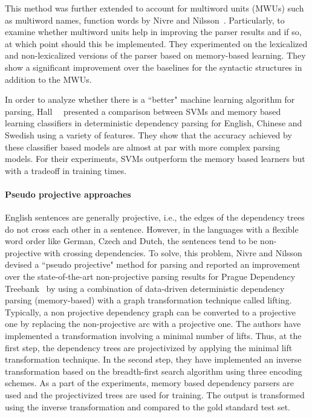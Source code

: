 This method was further extended to account for multiword units (MWUs) such as multiword names, function words by Nivre and Nilsson~\cite{nivre2004multiword}. Particularly, to examine whether multiword units help in improving the parser results and if so, at which point should this be implemented. They experimented on the lexicalized and non-lexicalized versions of the parser based on memory-based learning. They show a significant improvement over the baselines for the syntactic structures in addition to the MWUs.

In order to analyze whether there is a ``better" machine learning algorithm for parsing, Hall~\etal~\cite{Hall:2006:DCD:1273073.1273114} presented a comparison between SVMs and memory based learning classifiers in deterministic dependency parsing for English, Chinese and Swedish using a variety of features. They show that the accuracy achieved by these classifier based models are almost at par with more complex parsing models. For their experiments, SVMs outperform the memory based learners but with a tradeoff in training times.

\paragraph{Pseudo projective approaches}

English sentences are generally projective, i.e., the edges of the dependency trees do not cross each other in a sentence. However, in the languages with a flexible word order like German, Czech and Dutch, the sentences tend to be non-projective with crossing dependencies. To solve, this problem, Nivre and Nilsson~\cite{nivre2005pseudo} devised a ``pseudo projective" method for parsing and reported an improvement over the state-of-the-art non-projective parsing results for Prague Dependency Treebank~\cite{bohmova2003prague,hajic1998building} by using a combination of data-driven deterministic dependency parsing (memory-based) with a graph transformation technique called lifting. Typically, a non projective dependency graph can be converted to a projective one by replacing the non-projective arc with a projective one. The authors have implemented a transformation involving a minimal number of lifts. Thus, at the first step, the dependency trees are projectivized by applying the minimal lift transformation technique. In the second step, they have implemented an inverse transformation based on the breadth-first search algorithm using three encoding schemes. As a part of the experiments, memory based dependency parsers are used and the projectivized trees are used for training. The output is transformed using the inverse transformation and compared to the gold standard test set.

